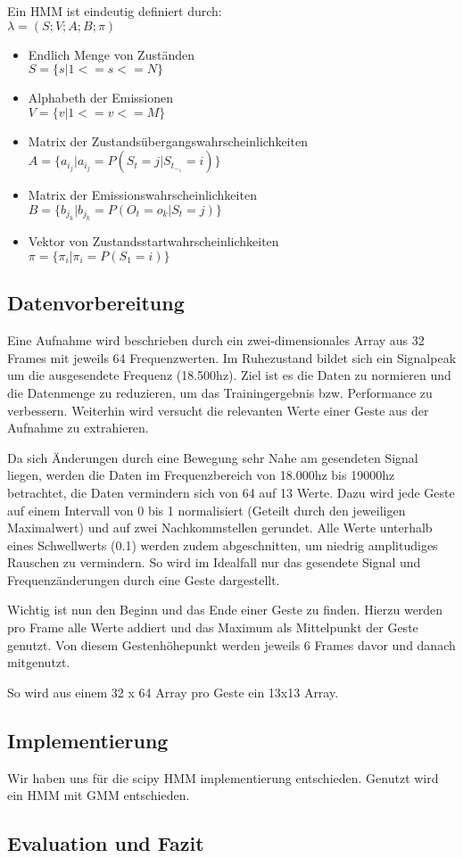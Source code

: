 Ein \acl{HMM} ist eindeutig definiert durch:\\ 
\( \lambda = (S;V;A;B;\pi)\)
\begin{itemize}
     \item Endlich Menge von Zuständen \\
           \( S = \{ s | 1 <= s <= N \} \)
     \item Alphabeth der Emissionen \\
           \( V = \{ v | 1 <= v <= M \} \)
     \item Matrix der Zustandsübergangswahrscheinlichkeiten \\
           \( A = \{ a_i_j | a_i_j = P(S_t = j | S_t_-_1 = i) \} \)
     \item Matrix der Emissionswahrscheinlichkeiten \\
           \( B = \{ b_j_k | b_j_k = P(O_t = o_k | S_t = j) \} \)
     \item Vektor von Zustandsstartwahrscheinlichkeiten \\
           \( \pi = \{ \pi_i | \pi_i = P(S_1 = i) \} \) 
   \end{itemize}
   

\subsection{Datenvorbereitung}
Eine Aufnahme wird beschrieben durch ein zwei-dimensionales Array aus 32 Frames mit jeweils 64 Frequenzwerten.
Im Ruhezustand bildet sich ein Signalpeak um die ausgesendete Frequenz (18.500hz).
Ziel ist es die Daten zu normieren und die Datenmenge zu reduzieren, um das Trainingergebnis bzw. Performance zu verbessern.
Weiterhin wird versucht die relevanten Werte einer Geste aus der Aufnahme zu extrahieren.

Da sich Änderungen durch eine Bewegung sehr Nahe am gesendeten Signal liegen, werden die Daten im 
Frequenzbereich von 18.000hz bis 19000hz betrachtet, die Daten vermindern sich von 64 auf 13 Werte. 
Dazu wird jede Geste auf einem Intervall von 0 bis 1 normalisiert (Geteilt durch den jeweiligen Maximalwert) und 
auf zwei Nachkommstellen gerundet. 
Alle Werte unterhalb eines Schwellwerts (0.1) werden zudem abgeschnitten, um niedrig amplitudiges Rauschen zu vermindern. 
So wird im Idealfall nur das gesendete Signal und Frequenzänderungen durch eine Geste dargestellt.

Wichtig ist nun den Beginn und das Ende einer Geste zu finden. Hierzu werden pro Frame alle Werte addiert 
und das Maximum als Mittelpunkt der Geste genutzt. Von diesem Gestenhöhepunkt werden jeweils 6 Frames davor und danach mitgenutzt.

So wird aus einem 32 x 64 Array pro Geste ein 13x13 Array.


\subsection{Implementierung}
Wir haben uns für die scipy HMM implementierung entschieden. 
Genutzt wird ein \acl{HMM} mit \acl{GMM} entschieden.


\subsection{Evaluation und Fazit}
